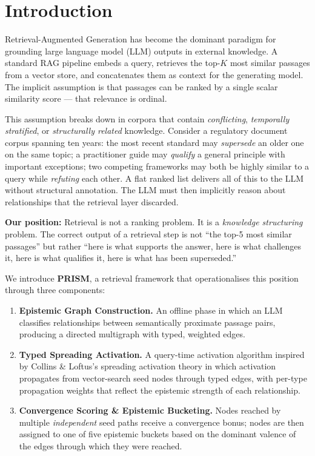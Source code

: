 \documentclass[11pt,a4paper]{article}
\begin{document}
\section{Introduction}
\label{sec:intro}

Retrieval-Augmented Generation \citep{lewis2020rag} has become the dominant
paradigm for grounding large language model (LLM) outputs in external knowledge.
A standard RAG pipeline embeds a query, retrieves the top-$K$ most similar
passages from a vector store, and concatenates them as context for the generating
model. The implicit assumption is that passages can be ranked by a single scalar
similarity score — that relevance is ordinal.

This assumption breaks down in corpora that contain \emph{conflicting},
\emph{temporally stratified}, or \emph{structurally related} knowledge.
Consider a regulatory document corpus spanning ten years: the most recent
standard may \emph{supersede} an older one on the same topic; a practitioner
guide may \emph{qualify} a general principle with important exceptions; two
competing frameworks may both be highly similar to a query while
\emph{refuting} each other. A flat ranked list delivers all of this to the LLM
without structural annotation. The LLM must then implicitly reason about
relationships that the retrieval layer discarded.

\textbf{Our position:} Retrieval is not a ranking problem. It is a
\emph{knowledge structuring} problem. The correct output of a retrieval step
is not \enquote{the top-5 most similar passages} but rather
\enquote{here is what supports the answer, here is what challenges it,
here is what qualifies it, here is what has been superseded.}

We introduce \textbf{PRISM}, a retrieval framework that operationalises
this position through three components:

\begin{enumerate}[leftmargin=*]
  \item \textbf{Epistemic Graph Construction.} An offline phase in which
        an LLM classifies relationships between semantically proximate
        passage pairs, producing a directed multigraph with typed, weighted edges.

  \item \textbf{Typed Spreading Activation.} A query-time activation
        algorithm inspired by Collins \& Loftus's spreading activation theory
        \citep{collins1975spreading} in which activation propagates from
        vector-search seed nodes through typed edges, with per-type propagation
        weights that reflect the epistemic strength of each relationship.

  \item \textbf{Convergence Scoring \& Epistemic Bucketing.} Nodes reached
        by multiple \emph{independent} seed paths receive a convergence bonus;
        nodes are then assigned to one of five epistemic buckets based on the
        dominant valence of the edges through which they were reached.
\end{enumerate}
\end{document}
